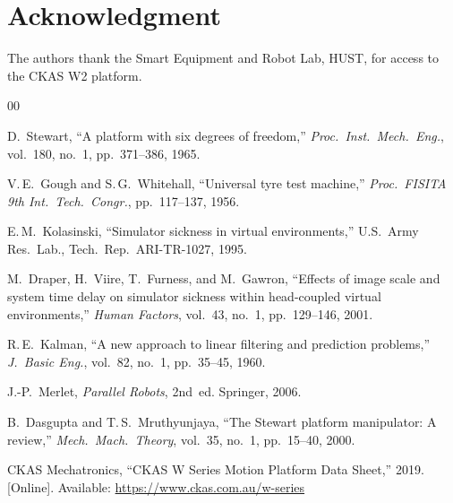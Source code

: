 \documentclass[conference]{IEEEtran}
\begin{document}
\section*{Acknowledgment}
The authors thank the Smart Equipment and Robot Lab, HUST, for access
to the CKAS W2 platform.

\begin{thebibliography}{00}

D.~Stewart,
``A platform with six degrees of freedom,''
\emph{Proc.\ Inst.\ Mech.\ Eng.}, vol.~180, no.~1,
pp.~371--386, 1965.

V.\,E.~Gough and S.\,G.~Whitehall,
``Universal tyre test machine,''
\emph{Proc.\ FISITA 9th Int.\ Tech.\ Congr.}, pp.~117--137, 1956.

E.\,M.~Kolasinski,
``Simulator sickness in virtual environments,''
U.S.\ Army Res.\ Lab., Tech.\ Rep.\ ARI-TR-1027, 1995.

M.~Draper, H.~Viire, T.~Furness, and M.~Gawron,
``Effects of image scale and system time delay on simulator sickness
within head-coupled virtual environments,''
\emph{Human Factors}, vol.~43, no.~1, pp.~129--146, 2001.

R.\,E.~Kalman,
``A new approach to linear filtering and prediction problems,''
\emph{J.\ Basic Eng.}, vol.~82, no.~1, pp.~35--45, 1960.

J.-P.~Merlet,
\emph{Parallel Robots}, 2nd~ed.
Springer, 2006.

B.~Dasgupta and T.\,S.~Mruthyunjaya,
``The Stewart platform manipulator: A review,''
\emph{Mech.\ Mach.\ Theory}, vol.~35, no.~1, pp.~15--40, 2000.

CKAS Mechatronics,
``CKAS W Series Motion Platform Data Sheet,'' 2019.
[Online]. Available: \url{https://www.ckas.com.au/w-series}

\end{thebibliography}
\end{document}

